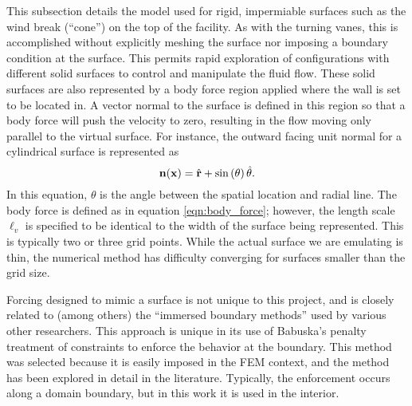 This subsection details the model used for rigid, impermiable surfaces
such as the wind break (``cone'') on the top of the facility. As with
the turning vanes, this is accomplished without explicitly meshing the
surface nor imposing  a boundary condition at the surface. This permits
rapid exploration of configurations  with different solid surfaces to
control and manipulate the fluid flow. These solid surfaces are also
represented by a body force region applied where the wall is set to be
located in.  A vector normal to the surface is defined in this region so
that a body force will push  the velocity to zero, resulting in the flow
moving only parallel to the virtual surface. For instance, the outward
facing unit normal for a cylindrical surface is represented as 
\begin{equation}
 {\bf n}({\bf x}) = \hat{{\bf r}}+ \sin \left(\theta\right) \hat{{\bf \theta}}.
\end{equation}
In this equation, $\theta$ is the angle between the spatial location and
radial line. The body force is defined as in equation
\ref{eqn:body_force}; however, the length scale $\ell_v$ is specified to
be identical to the width  of the surface being represented. This is
typically two or three grid points. While the actual surface we are
emulating is thin, the numerical method has difficulty converging for
surfaces smaller than the grid size.  

Forcing designed to mimic a surface
is not unique to this project, and is closely related to (among others)
the ``immersed boundary methods'' used by various other
researchers\cite{doi:10.1146/annurev.fluid.37.061903.175743}. 
This approach is unique in its use of Babuska's penalty treatment of
constraints\cite{1973fempen,ZAMM:ZAMM19880680925} to enforce the
behavior at the boundary. This method was selected because it is easily
imposed in the FEM context, and the method has been explored in detail
in the literature. Typically, the enforcement occurs along a domain
boundary, but in this work it is used in the interior. 

